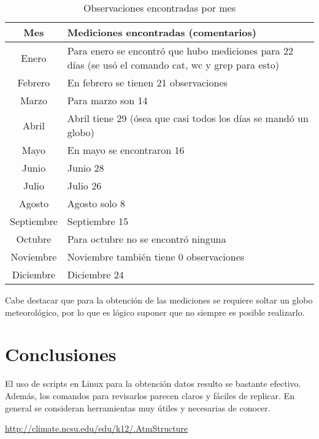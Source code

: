 \documentclass[12pt,letterpaper]{article}
\begin{document}
\begin{table}[ht]
\begin{center}
\begin{tabular}{|c|m{10cm}|}
\hline
Mes &  Mediciones encontradas (comentarios) \\
\hline
Enero	&	Para enero se encontró que hubo mediciones para 22 días (se usó el comando cat, wc y grep para esto) \\
Febrero	&	En febrero se tienen 21 observaciones	\\
Marzo	&	Para marzo son 14	\\
Abril 	&	Abril tiene 29 (ósea que casi todos los días se mandó un globo)	\\
Mayo	&	En mayo se encontraron 16	\\
Junio	&	Junio 28	\\
Julio	&	Julio 26 	\\
Agosto	&	Agosto solo 8	\\
Septiembre	&	Septiembre 15	\\
Octubre 	&	Para octubre no se encontró ninguna	\\
Noviembre	&	Noviembre también tiene 0 observaciones	\\
Diciembre	&	Diciembre 24	\\

\hline
\end{tabular}
\end{center}
\caption{Observaciones encontradas por mes}
\end{table}

Cabe destacar que para la obtención de las mediciones se requiere soltar un globo meteorológico, por lo que es lógico suponer que no siempre es posible realizarlo.

\section{Conclusiones} 

El uso de scripts en Linux para la obtención datos resulto se bastante efectivo. Además, los comandos para revisarlos parecen claros y fáciles de replicar. En general se consideran herramientas muy útiles y necesarias de conocer.

\begin{thebibliography}{2}
 \url{http://climate.ncsu.edu/edu/k12/.AtmStructure}

\end{thebibliography}
\end{document}
